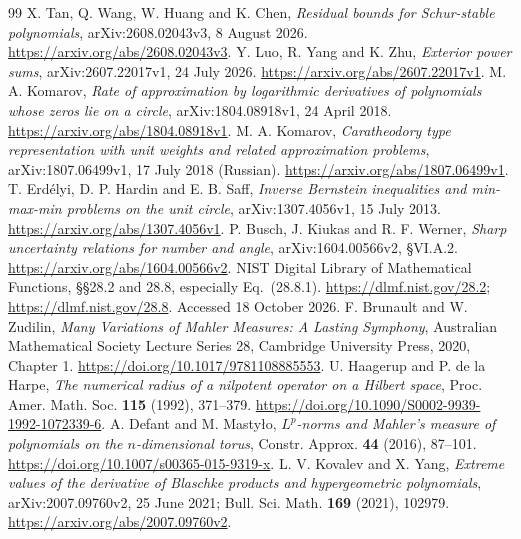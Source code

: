 \documentclass[11pt]{article}
\theoremstyle{remark}\newtheorem{remark}[theorem]{Remark}
\begin{document}
\begin{thebibliography}{99}
X. Tan, Q. Wang, W. Huang and K. Chen,
\emph{Residual bounds for Schur-stable polynomials},
arXiv:2608.02043v3, 8 August 2026.
\url{https://arxiv.org/abs/2608.02043v3}.
Y. Luo, R. Yang and K. Zhu,
\emph{Exterior power sums},
arXiv:2607.22017v1, 24 July 2026.
\url{https://arxiv.org/abs/2607.22017v1}.
M. A. Komarov,
\emph{Rate of approximation by logarithmic derivatives of polynomials
whose zeros lie on a circle}, arXiv:1804.08918v1, 24 April 2018.
\url{https://arxiv.org/abs/1804.08918v1}.
M. A. Komarov,
\emph{Caratheodory type representation with unit weights and related
approximation problems}, arXiv:1807.06499v1, 17 July 2018 (Russian).
\url{https://arxiv.org/abs/1807.06499v1}.
T. Erd\'elyi, D. P. Hardin and E. B. Saff,
\emph{Inverse Bernstein inequalities and min-max-min problems on
the unit circle}, arXiv:1307.4056v1, 15 July 2013.
\url{https://arxiv.org/abs/1307.4056v1}.
P. Busch, J. Kiukas and R. F. Werner,
\emph{Sharp uncertainty relations for number and angle},
arXiv:1604.00566v2, \S VI.A.2.
\url{https://arxiv.org/abs/1604.00566v2}.
NIST Digital Library of Mathematical Functions,
\S\S28.2 and 28.8, especially Eq.~(28.8.1).
\url{https://dlmf.nist.gov/28.2};\newline
\url{https://dlmf.nist.gov/28.8}. Accessed 18 October 2026.
F. Brunault and W. Zudilin,
\emph{Many Variations of Mahler Measures: A Lasting Symphony},
Australian Mathematical Society Lecture Series 28,
Cambridge University Press, 2020, Chapter 1.
\url{https://doi.org/10.1017/9781108885553}.
U. Haagerup and P. de la Harpe,
\emph{The numerical radius of a nilpotent operator on a Hilbert space},
Proc. Amer. Math. Soc. \textbf{115} (1992), 371--379.
\url{https://doi.org/10.1090/S0002-9939-1992-1072339-6}.
A. Defant and M. Masty\l o,
\emph{\(L^p\)-norms and Mahler's measure of polynomials on the
\(n\)-dimensional torus}, Constr. Approx. \textbf{44} (2016), 87--101.
\url{https://doi.org/10.1007/s00365-015-9319-x}.
L. V. Kovalev and X. Yang,
\emph{Extreme values of the derivative of Blaschke products and
hypergeometric polynomials}, arXiv:2007.09760v2, 25 June 2021;
Bull. Sci. Math. \textbf{169} (2021), 102979.
\url{https://arxiv.org/abs/2007.09760v2}.
\end{thebibliography}
\end{document}
